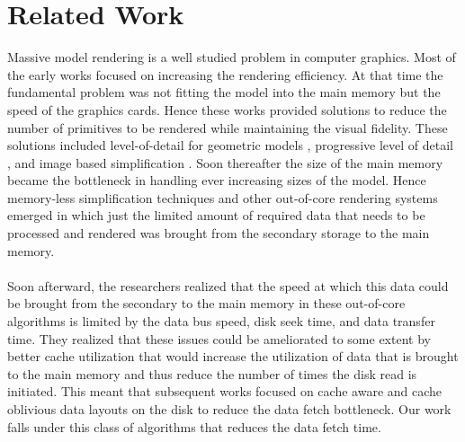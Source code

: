 \documentclass[conference]{acmsiggraph}
\begin{document}
\section{Related Work}

Massive model rendering is a well studied problem in computer graphics. Most of the early works focused on increasing the rendering efficiency. At that time the fundamental problem was not fitting the model into the main memory but the speed of the graphics cards. Hence these works provided solutions to reduce the number of primitives to be rendered while maintaining the visual fidelity. These solutions included level-of-detail for geometric models \cite{Luebke02}, progressive level of detail \cite{Hoppe:98b,Hoppe:97,Hoppe:96,SG:01}, and image based simplification \cite{Aliaga,Hansong,Zhang}. Soon thereafter the size of the main memory became the bottleneck in handling ever increasing sizes of the model. Hence memory-less simplification techniques \cite{Lindstrom}  and other out-of-core rendering systems \cite{Correa,Varadhan} emerged in which just the limited amount of required data that needs to be processed and rendered was brought from the secondary storage to the main memory. \\
\\
Soon afterward, the researchers realized that the speed at which this data could be brought from the secondary to the main memory in these out-of-core algorithms is limited by the data bus speed, disk seek time, and data transfer time. They realized that these issues could be ameliorated to some extent by better cache utilization that would increase the utilization of data that is brought to the main memory and thus reduce the number of times the disk read is initiated. This meant that subsequent works focused on cache aware \cite{ssdpaper} and cache oblivious data layouts \cite{Yoon, other lindstrom's works} on the disk to reduce the  data fetch bottleneck. Our work falls under this class of algorithms that reduces the data fetch time. \\
\\
\end{document}
